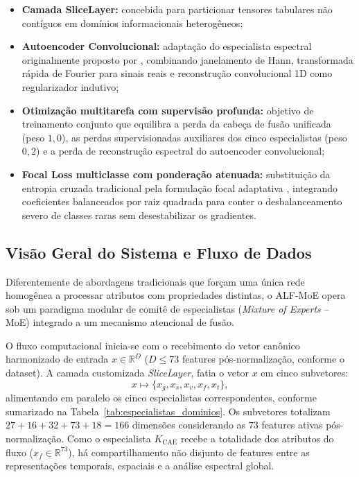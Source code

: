 \begin{itemize}
    
    \item \textbf{Camada SliceLayer:} concebida para particionar tensores tabulares não contíguos em domínios 
    informacionais heterogêneos;

    \item \textbf{Autoencoder Convolucional:} adaptação do especialista espectral originalmente proposto por 
    , combinando janelamento de Hann, transformada rápida de Fourier para sinais reais e 
    reconstrução convolucional 1D como regularizador indutivo;

    \item \textbf{Otimização multitarefa com supervisão profunda:} objetivo de treinamento conjunto que equilibra a 
    perda da cabeça de fusão unificada (peso $1{,}0$), as perdas supervisionadas auxiliares dos cinco especialistas 
    (peso $0{,}2$) e a perda de reconstrução espectral do autoencoder convolucional;

    \item \textbf{Focal Loss multiclasse com ponderação atenuada:} substituição da entropia cruzada tradicional pela 
    formulação focal adaptativa \cite{lin2017focal}, integrando coeficientes balanceados por raiz quadrada para conter o
    desbalanceamento severo de classes raras sem desestabilizar os gradientes.

\end{itemize}



\subsection{Visão Geral do Sistema e Fluxo de Dados}
\label{subsec:visao_geral_alfmoe}

Diferentemente de abordagens tradicionais que forçam uma única rede homogênea a processar atributos com propriedades 
distintas, o ALF-MoE opera sob um paradigma modular de comitê de especialistas (\emph{Mixture of Experts} -- MoE) 
integrado a um mecanismo atencional de fusão. 

O fluxo computacional inicia-se com o recebimento do vetor canônico harmonizado de entrada $x \in \mathbb{R}^D$ 
($D \le 73$ features pós-normalização, conforme o dataset). A camada customizada \emph{SliceLayer}, fatia o vetor $x$ em
 cinco subvetores:
\begin{equation}
\label{eq:slicing_functional}
x \mapsto \{x_g, x_s, x_v, x_f, x_t\},
\end{equation}
alimentando em paralelo os cinco especialistas correspondentes, conforme sumarizado na 
Tabela~\ref{tab:especialistas_dominios}. Os subvetores totalizam $27 + 16 + 32 + 73 + 18 = 166$ 
dimensões considerando as $73$ features ativas pós-normalização. Como o especialista $K_{\mathrm{CAE}}$ 
recebe a totalidade dos atributos do fluxo ($x_f \in \mathbb{R}^{73}$), há compartilhamento não disjunto 
de features entre as representações temporais, espaciais e a análise espectral global.


